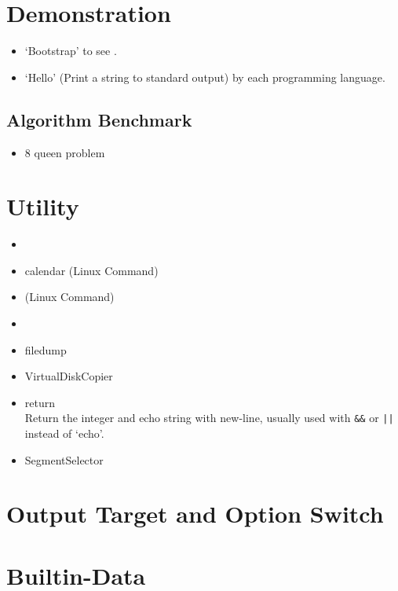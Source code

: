 \section{Demonstration}

\begin{itemize}
	\item `Bootstrap' to see .
	\item `Hello' (Print a string to standard output) by each programming language. 
\end{itemize}

\subsection{Algorithm Benchmark}

\begin{itemize}
	\item 8 queen problem
\end{itemize}

\section{Utility}

\begin{itemize}
\item {}
\item {}    calendar (Linux Command)
\item {}  (Linux Command)
\item {}
\item {}  filedump
\item {}  VirtualDiskCopier
\item {}    return \\
	Return the integer and echo string with new-line, usually used with \verb`&&` or \verb `||` instead of `echo'.
\item {} SegmentSelector
\end{itemize}

\section{Output Target and Option Switch}


\section{Builtin-Data}

